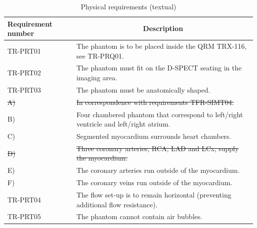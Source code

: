 \begin{table}[H]
\caption{Physical requirements (textual)}
\label{tab:physrec_text}
\begin{tabular}{p{25mm}|p{115mm}|}
	\textbf{Requirement number} & \multicolumn{1}{c}{\textbf{Description}} \\
	\hline
	TR-PRT01 			& The phantom is to be placed inside the QRM TRX-116, see TR-PRQ01. \\
	TR-PRT02 			& The phantom must fit on the D-SPECT seating in the imaging area. \\
	TR-PRT03 			& The phantom must be anatomically shaped. \\
	\hspace{1.5cm} \sout{A)} 	& \sout{In correspondence with requirements TFR-SIMT04.} \\
	\hspace{1.5cm} B) 	& Four chambered phantom that correspond to left/right ventricle and left/right atrium. \\
	\hspace{1.5cm} C) 	& Segmented myocardium surrounds heart chambers. \\
	\hspace{1.5cm}\sout{D)}	& \sout{Three coronary arteries, RCA, LAD and LCx, supply the myocardium.} \\
	\hspace{1.5cm} E) 	& The coronary arteries run outside of the myocardium. \\
	\hspace{1.5cm} F) 	& The coronary veins run outside of the myocardium. \\
	TR-PRT04 			& The flow set-up is to remain horizontal (preventing additional flow resistance). \\
	TR-PRT05 			& The phantom cannot contain air bubbles. \\
	\cline{2-2}
\end{tabular}
\end{table}

